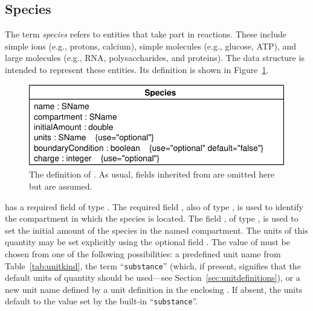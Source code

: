 \documentclass[10pt]{cekarticle}
\newcommand{\vref}[1]{\ref{#1}}
\newcommand{\changed}[1]{\textcolor{BrickRed}{#1}}
\begin{document}
\subsection{Species}
\label{sec:species}

The term \emph{species} refers to entities that take part in reactions.
These include simple ions (e.g., protons, calcium), simple molecules (e.g.,
glucose, ATP), and large molecules (e.g., RNA, polysaccharides, and
proteins).  The  data structure is intended to represent
these entities.  Its definition is shown in Figure~\vref{fig:species}.

\begin{figure}[htb]
  \centering
  \vspace*{5pt}
  \includegraphics[scale = 0.65]{species}
  \caption{The definition of .  As usual, fields inherited from
     are omitted here but are assumed.}
  \label{fig:species}
\end{figure}

 has a required  field of type .
The required field , also of type , is
used to identify the compartment in which the species is located.  The field
, of type , is used to set the initial
amount of the species in the named compartment.  The units of \changed{this
  quantity may be set explicitly using the optional field \attrib{units}.
  The value of \attrib{units} must be chosen from one of the following
  possibilities: a predefined unit name from Table~\ref{tab:unitkind}, the
  term ``\texttt{substance}'' (which, if present, signifies that the
  default} \changed{units of quantity should be used---see
  Section~\ref{sec:unitdefinitions}), or a new unit name defined by a unit
  definition in the enclosing \class{Model}.  If absent, the units default
  to the value set by the built-in ``\texttt{substance}''.}
\end{document}
